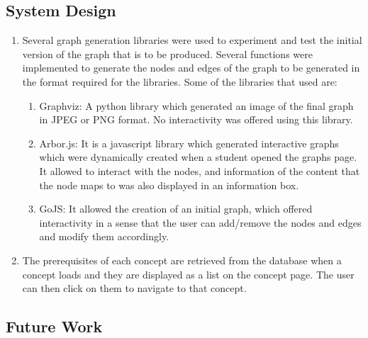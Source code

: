 \subsection{System Design}

\begin{enumerate}
	\item Several graph generation libraries were used to experiment and test the initial version of the graph that is to be produced. Several functions were implemented to generate the nodes and edges of the graph to be generated in the format required for the libraries. Some of the libraries that used are:
	\begin{enumerate}
		\item Graphviz: A python library which generated an image of the final graph in JPEG or PNG format. No interactivity was offered using this library.
		\item Arbor.js: It is a javascript library which generated interactive graphs which were dynamically created when a student opened the graphs page. It allowed to interact with the nodes, and information of the content that the node maps to was also displayed in an information box.
		\item GoJS: It allowed the creation of an initial graph, which offered interactivity in a sense that the user can add/remove the nodes and edges and modify them accordingly.
	\end{enumerate}

	\item The prerequisites of each concept are retrieved from the database when a concept loads and they are displayed as a list on the concept page. The user can then click on them to navigate to that concept.
\end{enumerate}

\subsection{Future Work}

